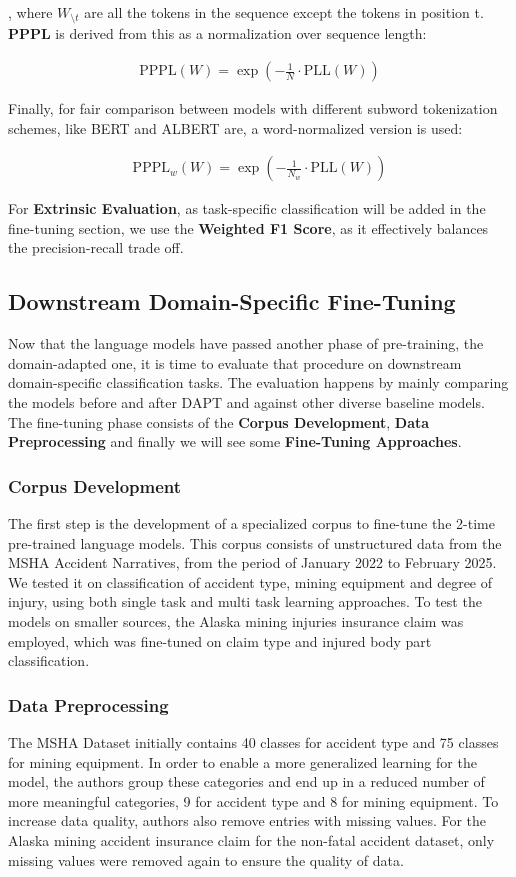\documentclass[a4paper,12pt]{article}
\begin{document}
, where $W_{\setminus t}$ are all the tokens in the sequence except the tokens in position t. \textbf{PPPL} is derived from this as a normalization over sequence length:

\begin{align}
\text{PPPL}(W) = \exp\left( -\frac{1}{N} \cdot \text{PLL}(W) \right)
\end{align}

Finally, for fair comparison between models with different subword tokenization schemes, like BERT and ALBERT are, a word-normalized version is used:

\begin{align}
\text{PPPL}_w(W) = \exp\left( -\frac{1}{N_w} \cdot \text{PLL}(W) \right)
\end{align}

For \textbf{Extrinsic Evaluation}, as task-specific classification will be added in the fine-tuning section, we use the \textbf{Weighted F1 Score}, as it effectively balances the precision-recall trade off.

\subsection{Downstream Domain-Specific Fine-Tuning}
Now that the language models have passed another phase of pre-training, the domain-adapted one, it is time to evaluate that procedure on downstream domain-specific classification tasks. The evaluation happens by mainly comparing the models before and after DAPT and against other diverse baseline models. The fine-tuning phase consists of the \textbf{Corpus Development},
\textbf{Data Preprocessing} and finally we will see some \textbf{Fine-Tuning Approaches}.

\subsubsection{Corpus Development}
The first step is the development of a specialized corpus to fine-tune the 2-time pre-trained language models. This corpus consists of unstructured data from the MSHA Accident Narratives, from the period of January 2022 to February 2025. We tested it on classification of accident type, mining equipment and degree of injury, using both single task and multi task learning approaches. To test the models on smaller sources, the Alaska mining injuries insurance claim was employed, which was fine-tuned on claim type and injured body part classification.

\subsubsection{Data Preprocessing}
The MSHA Dataset initially contains 40 classes for accident type and 75 classes for mining equipment. In order to enable a more generalized learning for the model, the authors group these categories and end up in a reduced number of more meaningful categories, 9 for accident type and 8 for mining equipment. To increase data quality, authors also remove entries with missing values. For the Alaska mining accident insurance claim for the non-fatal accident dataset, only missing values were removed again to ensure the quality of data.
\end{document}
